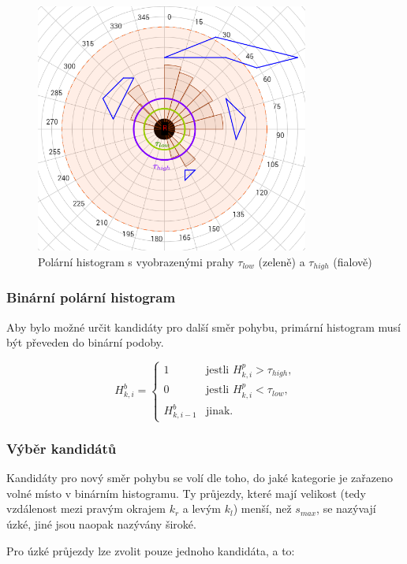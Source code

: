 \documentclass[twoside]{ctuthesis}
\theoremstyle{plain}
\theoremstyle{definition}
\theoremstyle{note}
\begin{document}
\begin{figure}
	\caption{Polární histogram s vyobrazenými prahy $\tau_{low}$ (zeleně) a $\tau_{high}$ (fialově)}

	\label{polar}
	\includegraphics[width=0.8\textwidth]{images/3/polar.png}
\end{figure}
\subsubsection{Binární polární histogram}

Aby bylo možné určit kandidáty pro další směr pohybu, primární histogram musí být převeden do binární podoby.

$$H_{k,i}^{b} = \left\{
\begin{array}{ll}
1&\textrm{jestli $H_{k,i}^p > \tau_{high}$,}\\
0&\textrm{jestli $H_{k,i}^p < \tau_{low}$,}\\
H_{k, i-1}^b&\textrm{jinak.}
\end{array}
\right.
$$

\subsubsection{Výběr kandidátů}

Kandidáty pro nový směr pohybu se volí dle toho, do jaké kategorie je zařazeno volné místo v binárním histogramu. Ty průjezdy, které mají velikost (tedy vzdálenost mezi pravým okrajem $k_r$ a levým $k_l$) menší, než $s_{max}$, se nazývají úzké, jiné jsou naopak nazývány široké.

Pro úzké průjezdy lze zvolit pouze jednoho kandidáta, a to:
\end{document}
